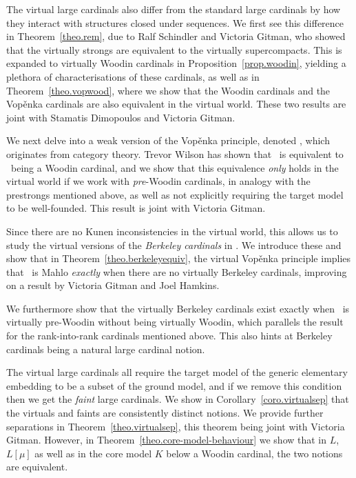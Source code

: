 \documentclass[../main]{subfiles}
\begin{document}
\begin{onehalfspacing}
\quad The virtual large cardinals also differ from the standard large cardinals by how they interact with structures closed under sequences. We first see this difference in Theorem~\ref{theo.rem}, due to Ralf Schindler and Victoria Gitman, who showed that the virtually strongs are equivalent to the virtually supercompacts. This is expanded to virtually Woodin cardinals in Proposition~\ref{prop.woodin}, yielding a plethora of characterisations of these cardinals, as well as in Theorem~\ref{theo.vopwood}, where we show that the Woodin cardinals and the Vop\v enka cardinals are also equivalent in the virtual world. These two results are joint with Stamatis Dimopoulos and Victoria Gitman.

\quad We next delve into a weak version of the Vop\v enka principle, denoted \wvp, which originates from category theory. Trevor Wilson has shown that \wvp\ is equivalent to \on\ being a Woodin cardinal, and we show that this equivalence \textit{only} holds in the virtual world if we work with \textit{pre}-Woodin cardinals, in analogy with the prestrongs mentioned above, as well as not explicitly requiring the target model to be well-founded. This result is joint with Victoria Gitman.

\quad Since there are no Kunen inconsistencies in the virtual world, this allows us to study the virtual versions of the \textit{Berkeley cardinals} in \zfc. We introduce these and show that in Theorem~\ref{theo.berkeleyequiv}, the virtual Vop\v enka principle implies that \on\ is Mahlo \textit{exactly} when there are no virtually Berkeley cardinals, improving on a result by Victoria Gitman and Joel Hamkins.

\quad We furthermore show that the virtually Berkeley cardinals exist exactly when \on\ is virtually pre-Woodin without being virtually Woodin, which parallels the result for the rank-into-rank cardinals mentioned above. This also hints at Berkeley cardinals being a natural large cardinal notion.

\quad The virtual large cardinals all require the target model of the generic elementary embedding to be a subset of the ground model, and if we remove this condition then we get the \textit{faint} large cardinals. We show in Corollary~\ref{coro.virtualsep} that the virtuals and faints are consistently distinct notions. We provide further separations in Theorem~\ref{theo.virtualsep}, this theorem being joint with Victoria Gitman. However, in Theorem~\ref{theo.core-model-behaviour} we show that in $L$, $L[\mu]$ as well as in the core model $K$ below a Woodin cardinal, the two notions are equivalent.


\end{onehalfspacing}
\end{document}
